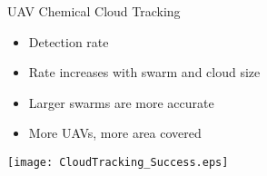 
\begin{slide}{UAV Chemical Cloud Tracking}
  \centering
  \begin{minipage}{.3\textwidth}
    \begin{itemize}
    \item Detection rate
    \item Rate increases with swarm and cloud size
    \item Larger swarms are more accurate
    \item More UAVs, more area covered
    \end{itemize}
  \end{minipage}
  \hfill
  \begin{minipage}{.6\textwidth}
    \texttt{[image: CloudTracking\_Success.eps]}
  \end{minipage}
\end{slide}
